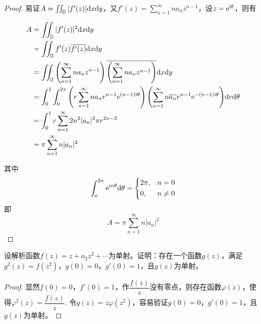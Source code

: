 \begin{proof}
    
    易证$A = \iint_{\mathbb{D}}{|f'(z)|}\mathrm{d} x\mathrm{d} y$，又$f'(z) = \sum\limits_{n = 1}^{\infty}{na_nz^{n - 1}}$，设$z = \mathrm{e}^{\mathrm{i}\theta}$，则有

    \begin{align*}
        A & = \iint_{\mathbb{D}}{|f'(z)|^2}\mathrm{d} x\mathrm{d} y \\ 
          & = \iint_{\mathbb{D}}{f'(z)\overline{{f'(z)}}}\mathrm{d} x\mathrm{d} y \\
          & = \iint_{\mathbb{D}}{\left( \sum\limits_{n = 1}^{\infty}{na_nz^{n - 1}} \right)\overline{\left( \sum\limits_{n = 1}^{\infty}{na_nz^{n - 1}} \right)}}\mathrm{d} x\mathrm{d} y \\
          & = \int_{0}^{1}{\int_{0}^{2 \pi}{\left( r\sum\limits_{n = 1}^{\infty}{na_nr^{n - 1}\mathrm{e}^{(n - 1)\mathrm{i}\theta}} \right)\left( \sum\limits_{n = 1}^{\infty}{n\overline{a_n}r^{n - 1}\mathrm{e}^{-(n - 1)\mathrm{i}\theta}} \right)}\mathrm{d} r}\mathrm{d} \theta \\
          & = \int_{0}^{1}{r\sum\limits_{n = 1}^{\infty}{2n^2|a_n|^2 \pi r^{2n - 2}}} \\
          & = \pi \sum\limits_{n = 1}^{\infty}{n|a_n|^2}
    \end{align*}

    其中
    $$
    \int_{o}^{2\pi}{\mathrm{e}^{\mathrm{i} n\theta}}\mathrm{d} \theta = 
    \left\{
        \begin{aligned}
            &2\pi, & n = 0 \\
            &0, & n \neq 0 \\
        \end{aligned}
    \right.
    $$
    即
    $$A = \pi \sum\limits_{n = 1}^{\infty}{n|a_n|^2}$$

\end{proof}

\begin{lemma}\label{lemma:complex}

    设解析函数$f(z) = z + a_2 z^2 + \cdots$为单射。证明：存在一个函数$g(z)$，满足$g^2(z) = f(z^2)$，$g(0) = 0$，$g'(0) = 1$，且$g(z)$为单射。

\end{lemma}

\begin{proof}

    显然$f(0) = 0$，$f'(0) = 1$，作$\dfrac{f(z)}{z}$没有零点，则存在函数$\varphi(z)$，使得$\varphi^2(z) = \dfrac{f(z)}{z}$. 令$g(z) = z\varphi(z^2)$，容易验证$g(0) = 0$，$g'(0) = 1$，且$g(z)$为单射。
    
\end{proof}

